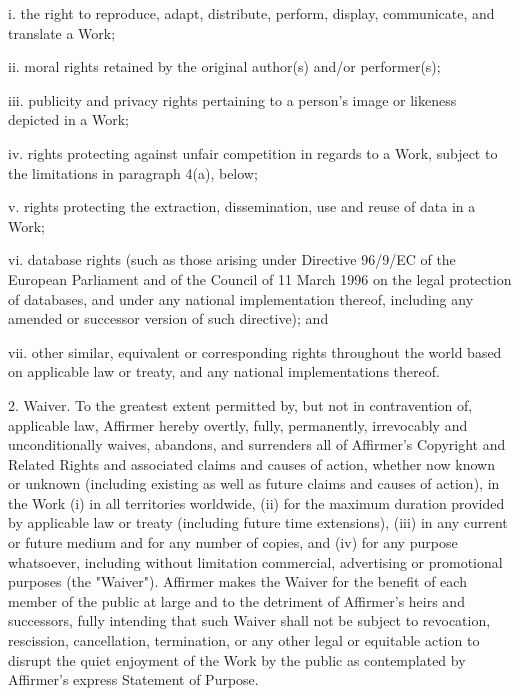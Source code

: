 \documentclass[10pt,letterpaper,twoside]{book}
\begin{document}
  i. the right to reproduce, adapt, distribute, perform, display, communicate,
  and translate a Work;

  ii. moral rights retained by the original author(s) and/or performer(s);

  iii. publicity and privacy rights pertaining to a person's image or likeness
  depicted in a Work;

  iv. rights protecting against unfair competition in regards to a Work,
  subject to the limitations in paragraph 4(a), below;

  v. rights protecting the extraction, dissemination, use and reuse of data in
  a Work;

  vi. database rights (such as those arising under Directive 96/9/EC of the
  European Parliament and of the Council of 11 March 1996 on the legal
  protection of databases, and under any national implementation thereof,
  including any amended or successor version of such directive); and

  vii. other similar, equivalent or corresponding rights throughout the world
  based on applicable law or treaty, and any national implementations thereof.

2. Waiver. To the greatest extent permitted by, but not in contravention of,
applicable law, Affirmer hereby overtly, fully, permanently, irrevocably and
unconditionally waives, abandons, and surrenders all of Affirmer's Copyright
and Related Rights and associated claims and causes of action, whether now
known or unknown (including existing as well as future claims and causes of
action), in the Work (i) in all territories worldwide, (ii) for the maximum
duration provided by applicable law or treaty (including future time
extensions), (iii) in any current or future medium and for any number of
copies, and (iv) for any purpose whatsoever, including without limitation
commercial, advertising or promotional purposes (the "Waiver"). Affirmer makes
the Waiver for the benefit of each member of the public at large and to the
detriment of Affirmer's heirs and successors, fully intending that such Waiver
shall not be subject to revocation, rescission, cancellation, termination, or
any other legal or equitable action to disrupt the quiet enjoyment of the Work
by the public as contemplated by Affirmer's express Statement of Purpose.
\end{document}
